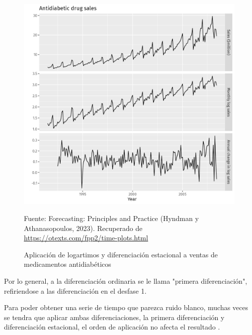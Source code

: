 \begin{itemize}
    \begin{figure}[H]
        \begin{minipage}[t]{0.9\textwidth}
            \caption{Aplicación de logartimos y diferenciación estacional a ventas de medicamentos antidiabéticos}
            \label{seasonaldiff}        
        \end{minipage}
    
        \vspace{10pt}
    
        \begin{minipage}[b]{1.1\textwidth}
            \centering
            \includegraphics[width=\textwidth]{img/a10diff-1-seasonaldiff-example.png}        
        \end{minipage}
    
        \begin{minipage}[t]{0.9\textwidth}
            Fuente: Forecasting: Principles and Practice (Hyndman y Athanasopoulos, 2023). Recuperado de \url{https://otexts.com/fpp2/time-plots.html}
        \end{minipage}
    \end{figure}

    Por lo general, a la diferenciación ordinaria se le llama "primera diferenciación", refiriendose a las diferenciación en el desfase 1. 
    
    Para poder obtener una serie de tiempo que parezca ruido blanco, muchas veces se tendra que aplicar ambas diferenciaciones, la primera diferenciación y diferenciación estacional, el orden de aplicación no afecta el resultado \cite{forecast-time-series-arima}.
    

\end{itemize}
